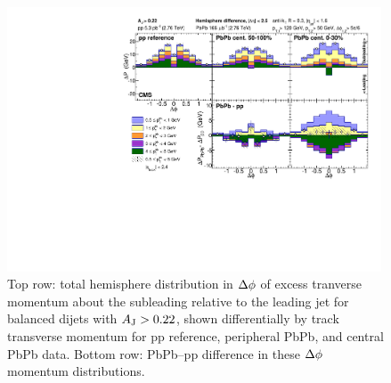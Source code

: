 \begin{figure}[hbt]
\begin{center} 
\includegraphics[width=0.99\textwidth]{figures/Results/Missing_pT_NoBkgSub_Aj22_Aj75.pdf}
\caption[Dijet subleading-to-leading hemisphere momentum balance for unbalanced dijets]{Top row:  total hemisphere distribution in $\protect\Delta\phi$ of excess tranverse momentum about the subleading relative to the leading jet for balanced dijets with $A_{\rm J} > 0.22$, shown differentially by track transverse momentum for pp reference, peripheral PbPb, and central PbPb data.  Bottom row:  PbPb--pp difference in these $\protect\Delta\phi$ momentum distributions.}
\label{fig:MpT_nobkgsub_Aj22_Aj75} 
\end{center} 
\end{figure} 

